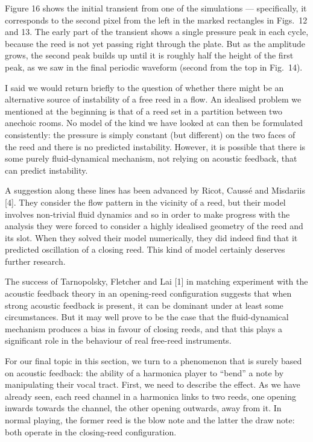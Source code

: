   Figure 16 shows the initial transient from one of the simulations — 
  specifically, it corresponds to the second pixel from the left in the marked 
  rectangles in Figs.\ 12 and 13. The early part of the transient shows a 
  single pressure peak in each cycle, because the reed is not yet passing right 
  through the plate. But as the amplitude grows, the second peak builds up 
  until it is roughly half the height of the first peak, as we saw in the final 
  periodic waveform (second from the top in Fig.\ 14). 


  I said we would return briefly to the question of whether there might be an 
  alternative source of instability of a free reed in a flow. An idealised 
  problem we mentioned at the beginning is that of a reed set in a partition 
  between two anechoic rooms. No model of the kind we have looked at can then 
  be formulated consistently: the pressure is simply constant (but different) 
  on the two faces of the reed and there is no predicted instability. However, 
  it is possible that there is some purely fluid-dynamical mechanism, not 
  relying on acoustic feedback, that can predict instability. 

  A suggestion along these lines has been advanced by Ricot, Caussé and 
  Misdariis [4]. They consider the flow pattern in the vicinity of a reed, but 
  their model involves non-trivial fluid dynamics and so in order to make 
  progress with the analysis they were forced to consider a highly idealised 
  geometry of the reed and its slot. When they solved their model numerically, 
  they did indeed find that it predicted oscillation of a closing reed. This 
  kind of model certainly deserves further research. 

  The success of Tarnopolsky, Fletcher and Lai [1] in matching experiment with 
  the acoustic feedback theory in an opening-reed configuration suggests that 
  when strong acoustic feedback is present, it can be dominant under at least 
  some circumstances. But it may well prove to be the case that the 
  fluid-dynamical mechanism produces a bias in favour of closing reeds, and 
  that this plays a significant role in the behaviour of real free-reed 
  instruments. 

  For our final topic in this section, we turn to a phenomenon that is surely 
  based on acoustic feedback: the ability of a harmonica player to “bend” a 
  note by manipulating their vocal tract. First, we need to describe the 
  effect. As we have already seen, each reed channel in a harmonica links to 
  two reeds, one opening inwards towards the channel, the other opening 
  outwards, away from it. In normal playing, the former reed is the blow note 
  and the latter the draw note: both operate in the closing-reed configuration. 

